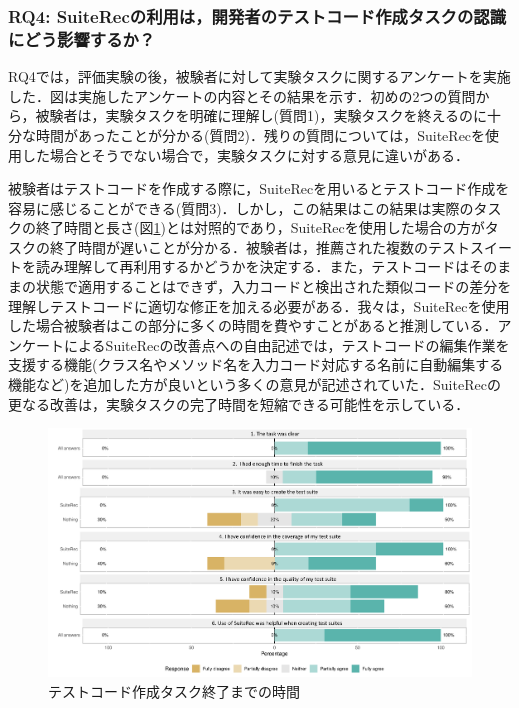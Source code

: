 \documentclass[12pt]{jarticle} %
\begin{document}
\subsubsection{RQ4: {\sf SuiteRec}の利用は，開発者のテストコード作成タスクの認識にどう影響するか？}

RQ4では，評価実験の後，被験者に対して実験タスクに関するアンケートを実施した．図は実施したアンケートの内容とその結果を示す．初めの2つの質問から，被験者は，実験タスクを明確に理解し(質問1)，実験タスクを終えるのに十分な時間があったことが分かる(質問2)．残りの質問については，{\sf SuiteRec}を使用した場合とそうでない場合で，実験タスクに対する意見に違いがある．

被験者はテストコードを作成する際に，{\sf SuiteRec}を用いるとテストコード作成を容易に感じることができる(質問3)．しかし，この結果はこの結果は実際のタスクの終了時間と長さ(図\ref{time})とは対照的であり，{\sf SuiteRec}を使用した場合の方がタスクの終了時間が遅いことが分かる．被験者は，推薦された複数のテストスイートを読み理解して再利用するかどうかを決定する．また，テストコードはそのままの状態で適用することはできず，入力コードと検出された類似コードの差分を理解しテストコードに適切な修正を加える必要がある．我々は，{\sf SuiteRec}を使用した場合被験者はこの部分に多くの時間を費やすことがあると推測している．アンケートによる{\sf SuiteRec}の改善点への自由記述では，テストコードの編集作業を支援する機能(クラス名やメソッド名を入力コード対応する名前に自動編集する機能など)を追加した方が良いという多くの意見が記述されていた．{\sf SuiteRec}の更なる改善は，実験タスクの完了時間を短縮できる可能性を示している．


\begin{figure}[htbp]
  \begin{center}
   \includegraphics[width=15cm]{suiterec-expt.pdf}
  \caption{テストコード作成タスク終了までの時間}
  \label{time}
  \end{center}
\end{figure}
\end{document}
